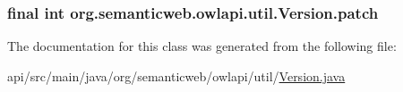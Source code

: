 \hypertarget{classorg_1_1semanticweb_1_1owlapi_1_1util_1_1_version_a8b44efb10df1048d6b13c557a92f120d}{
\subsubsection[{patch}]{\setlength{\rightskip}{0pt plus 5cm}final int org.\-semanticweb.\-owlapi.\-util.\-Version.\-patch\hspace{0.3cm}{\ttfamily [private]}}}\label{classorg_1_1semanticweb_1_1owlapi_1_1util_1_1_version_a8b44efb10df1048d6b13c557a92f120d}


The documentation for this class was generated from the following file\-:\begin{DoxyCompactItemize}
\item 
api/src/main/java/org/semanticweb/owlapi/util/\hyperlink{_version_8java}{Version.\-java}\end{DoxyCompactItemize}
